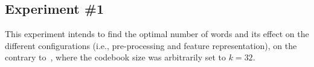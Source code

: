 %
%
%
%
%
%
%
%

\subsection{Experiment \#1}\label{subsec:exp1}
%
%
%
%

This experiment intends to find the optimal number of words and its effect on the different configurations (i.e., pre-processing and feature representation), on the contrary to~\cite{Lemaintre2015miccaiOCT}, where the codebook size was arbitrarily set to $k = 32$.

